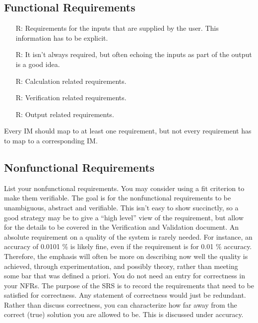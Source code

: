 \documentclass[12pt]{article}
\newcounter{reqnum} %
\begin{document}
\subsection{Functional Requirements}

\noindent \begin{itemize}

\item[R\refstepcounter{reqnum}\thereqnum \label{R_Inputs}:] Requirements
    for the inputs that are supplied by the user.  This information has to be
    explicit.

\item[R\refstepcounter{reqnum}\thereqnum \label{R_OutputInputs}:] It isn't
    always required, but often echoing the inputs as part of the output is a
    good idea.

\item[R\refstepcounter{reqnum}\thereqnum \label{R_Calculate}:] Calculation
    related requirements.

\item[R\refstepcounter{reqnum}\thereqnum \label{R_VerifyOutput}:]
  Verification related requirements.

\item[R\refstepcounter{reqnum}\thereqnum \label{R_Output}:] Output related
    requirements.

\end{itemize}

Every IM should map to at least one requirement, but not every requirement has
to map to a corresponding IM.

\subsection{Nonfunctional Requirements}

List your nonfunctional requirements.  You may consider using a fit criterion to
make them verifiable. The goal is for the nonfunctional requirements to be
unambiguous, abstract and verifiable.  This isn't easy to show succinctly, so a
good strategy may be to give a ``high level'' view of the requirement, but allow
for the details to be covered in the Verification and Validation document. An
absolute requirement on a quality of the system is rarely needed.  For instance,
an accuracy of 0.0101 \% is likely fine, even if the requirement is for 0.01 \%
accuracy.  Therefore, the emphasis will often be more on describing now well the
quality is achieved, through experimentation, and possibly theory, rather than
meeting some bar that was defined a priori. You do not need an entry for
correctness in your NFRs.  The purpose of the SRS is to record the requirements
that need to be satisfied for correctness. Any statement of correctness would
just be redundant. Rather than discuss correctness, you can characterize how far
away from the correct (true) solution you are allowed to be.  This is discussed
under accuracy.
\end{document}

